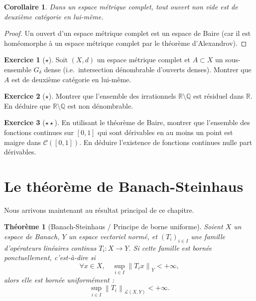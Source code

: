 \documentclass[a4paper,12pt]{book}
\newcommand{\Q}{\mathbb{Q}}
\newcommand{\R}{\mathbb{R}}
\newcommand{\norm}[1]{\left\| #1 \right\|}
\theoremstyle{definition}
\newtheorem{exercice}{Exercice}[chapter]
\theoremstyle{plain}
\newtheorem{theoreme}[definition]{Théorème}
\newtheorem{corollaire}[definition]{Corollaire}
\theoremstyle{remark}
\begin{document}
\begin{corollaire}
\label{cor:baire-ouvert}
Dans un espace métrique complet, tout ouvert non vide est de deuxième
catégorie en lui-même.
\end{corollaire}

\begin{proof}
Un ouvert d'un espace métrique complet est un espace de Baire
(car il est homéomorphe à un espace métrique complet par le
théorème d'Alexandrov).
\end{proof}

\begin{exercice}[$\star$]
\label{exo:Gdelta}
Soit $(X,d)$ un espace métrique complet et $A \subset X$ un sous-ensemble
$G_\delta$ dense (i.e.\ intersection dénombrable
d'ouverts denses). Montrer que $A$ est de deuxième catégorie en lui-même.
\end{exercice}

\begin{exercice}[$\star$]
\label{exo:irrationnels-residuels}
Montrer que l'ensemble des irrationnels $\R \setminus \Q$ est résiduel
dans $\R$. En déduire que $\R \setminus \Q$ est non dénombrable.
\end{exercice}

\begin{exercice}[$\star\star$]
\label{exo:nowhere-diff}
En utilisant le théorème de Baire, montrer que l'ensemble des fonctions
continues sur $[0,1]$ qui sont dérivables en au moins un point est
maigre dans $\mathcal{C}([0,1])$. En déduire l'existence de fonctions
continues nulle part dérivables.
\end{exercice}


\section{Le théorème de Banach-Steinhaus}
\label{sec:banach-steinhaus}


Nous arrivons maintenant au résultat principal de ce chapitre.

\begin{theoreme}[Banach-Steinhaus / Principe de borne uniforme]
\label{thm:banach-steinhaus}
Soient $X$ un espace de Banach, $Y$ un espace
vectoriel normé, et $(T_i)_{i \in I}$ une
famille d'opérateurs linéaires continus $T_i : X \to Y$. Si cette famille
est \emph{bornée ponctuellement}, c'est-à-dire si
\[
  \forall x \in X, \quad \sup_{i \in I} \norm{T_i x}_Y < +\infty,
\]
alors elle est \emph{bornée uniformément} :
\[
  \sup_{i \in I} \norm{T_i}_{\mathcal{L}(X,Y)} < +\infty.
\]
\end{theoreme}
\end{document}
